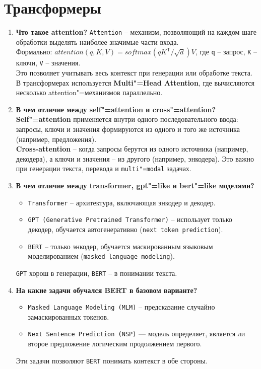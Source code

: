 \documentclass{article}
\begin{document}
\section{Трансформеры}
\begin{enumerate}
    \item \textbf{Что такое attention?} \texttt{Attention} -- механизм, позволяющий на каждом шаге обработки выделять наиболее значимые части входа. \\
    Формально: $attention(q, K, V) = softmax(qK^{\mathsf{T}} / \sqrt{d})V$, где \texttt{q} -- запрос, \texttt{K} -- ключи, \texttt{V} -- значения. \\
    Это позволяет учитывать весь контекст при генерации или обработке текста. В трансформерах используется \textbf{Multi"=Head Attention}, где вычисляются несколько attention"=механизмов параллельно.
    \item \textbf{В чем отличие между self"=attention и cross"=attention?} \\
    \textbf{Self"=attention} применяется внутри одного последовательного ввода: запросы, ключи и значения формируются из одного и того же источника (например, предложения). \\
    \textbf{Cross-attention} -- когда запросы берутся из одного источника (например, декодера), а ключи и значения -- из другого (например, энкодера). Это важно при генерации текста, перевода и \texttt{multi"=modal} задачах.
    \item \textbf{В чем отличие между transformer, gpt"=like и bert"=like моделями?}
    \begin{itemize}
        \item \texttt{Transformer} -- архитектура, включающая энкодер и декодер.
        \item \texttt{GPT (Generative Pretrained Transformer)} -- использует только декодер, обучается автогенеративно (\texttt{next token prediction}).
        \item \texttt{BERT} -- только энкодер, обучается маскированным языковым моделированием (\texttt{masked language modeling}).
    \end{itemize}
    \texttt{GPT} хорош в генерации, \texttt{BERT} -- в понимании текста.
    \item \textbf{На какие задачи обучался BERT в базовом варианте?}
    \begin{itemize}
        \item \texttt{Masked Language Modeling (MLM)} -- предсказание случайно замаскированных токенов.
        \item \texttt{Next Sentence Prediction (NSP)} — модель определяет, является ли второе предложение логическим продолжением первого.
    \end{itemize}
    Эти задачи позволяют \texttt{BERT} понимать контекст в обе стороны.
\end{enumerate}
\end{document}
